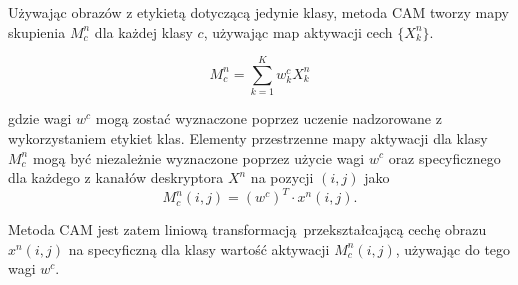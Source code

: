 \documentclass[a4paper,12pt,twoside,openany]{report}
\begin{document}
Używając obrazów z etykietą dotyczącą jedynie klasy, metoda CAM tworzy mapy skupienia $M^n_c$ dla każdej klasy $c$, używając map aktywacji cech $\{X^n_k\}$.

\begin{equation}
M^n_c = \sum^K_{k=1} w^c_kX^n_k
\end{equation}

gdzie wagi $w^c$ mogą zostać wyznaczone poprzez uczenie nadzorowane z wykorzystaniem etykiet klas. Elementy przestrzenne mapy aktywacji dla klasy $M^n_c$ mogą być niezależnie wyznaczone poprzez użycie wagi $w^c$ oraz specyficznego dla każdego z kanałów deskryptora $X^n$ na pozycji $(i,j)$ jako
\begin{equation}
M^n_c(i,j) = (w^c)^T \cdot x^n(i,j).
\end{equation}


Metoda CAM jest zatem liniową transformacją przekształcającą cechę obrazu $x^n(i,j)$ na specyficzną dla klasy wartość aktywacji $M^n_c(i,j)$, używając do tego wagi $w^c$.
\end{document}

